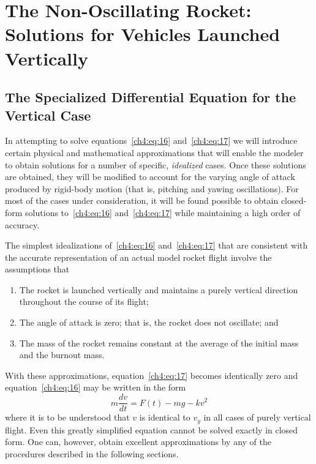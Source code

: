 \section{The Non-Oscillating Rocket: Solutions for Vehicles Launched Vertically}\label{ch4:sec:2}

\subsection{The Specialized Differential Equation for the Vertical Case}\label{ch4:sec:2.1}

In attempting to solve equations~\eqref{ch4:eq:16} and~\eqref{ch4:eq:17} we will introduce certain
physical and mathematical approximations that will enable the modeler to obtain solutions for a
number of specific, \emph{idealized} cases. Once these solutions are obtained, they will be modified
to account for the varying angle of attack produced by rigid-body motion (that is, pitching and
yawing oscillations). For most of the cases under consideration, it will be found possible to
obtain closed-form solutions to~\eqref{ch4:eq:16} and~\eqref{ch4:eq:17} while maintaining a high
order of accuracy.

The simplest idealizations of~\eqref{ch4:eq:16} and~\eqref{ch4:eq:17} that are consistent with the
accurate representation of an actual model rocket flight involve the assumptions that
\begin{enumerate}[label=(\alph*)]
  \item The rocket is launched vertically and maintains a purely vertical direction throughout the
  course of its flight;
  \item The angle of attack is zero; that is, the rocket does not oscillate; and
  \item The mass of the rocket remains constant at the average of the initial mass and the burnout
  mass.
\end{enumerate}
With these approximations, equation~\eqref{ch4:eq:17} becomes identically zero and
equation~\eqref{ch4:eq:16} may be written in the form
\begin{equation}\label{ch4:eq:18}
m\frac{dv}{dt} = F(t) - mg - kv^{2}
\end{equation}
where it is to be understood that $v$ is identical to $v_y$ in all cases of purely vertical flight.
Even this greatly simplified equation cannot be solved exactly in closed form. One can, however,
obtain excellent approximations by any of the procedures described in the following sections.


